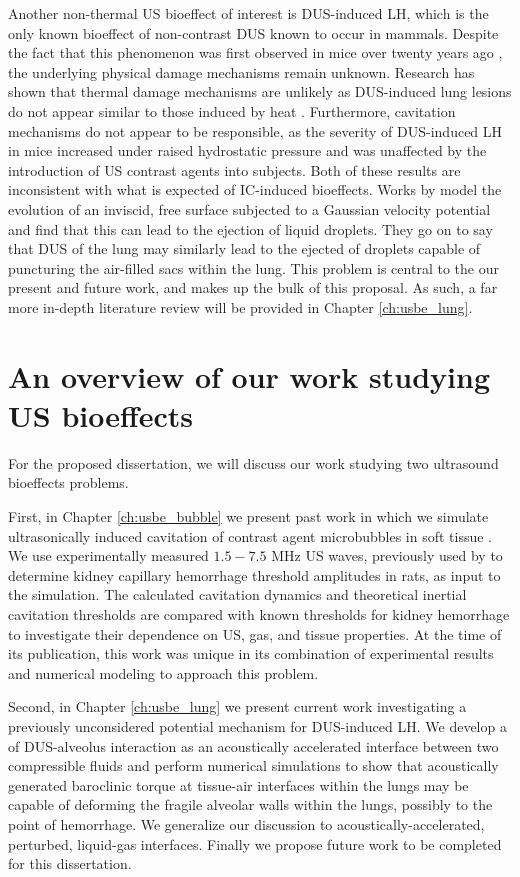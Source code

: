 Another non-thermal \ac{US} bioeffect of interest is \ac{DUS}-induced
\ac{LH}, which is the only known bioeffect of non-contrast \ac{DUS}
known to occur in mammals. Despite the fact that this phenomenon was
first observed in mice over twenty years ago \citep{Child1990}, the
underlying physical damage mechanisms remain unknown. Research has
shown that thermal damage mechanisms are unlikely as \ac{DUS}-induced
lung lesions do not appear similar to those induced by heat
\citep{Zachary2006}. Furthermore, cavitation mechanisms do not appear
to be responsible, as the severity of \ac{DUS}-induced \ac{LH} in mice
increased under raised hydrostatic pressure \citep{OBrien2000} and was
unaffected by the introduction of \ac{US} contrast agents into
subjects. Both of these results are inconsistent with what is expected
of \ac{IC}-induced bioeffects. Works by \cite{Tjan2007,Tjan2008} model
the evolution of an inviscid, free surface subjected to a Gaussian
velocity potential and find that this can lead to the ejection of
liquid droplets. They go on to say that \ac{DUS} of the lung may
similarly lead to the ejected of droplets capable of puncturing the
air-filled sacs within the lung. This problem is central to the our
present and future work, and makes up the bulk of this proposal. As
such, a far more in-depth literature review will be provided in
Chapter \ref{ch:usbe_lung}.

\section{An overview of our work studying \ac{US}
  bioeffects} \label{sec:usbe_intro_overview}%
For the proposed dissertation, we will discuss our work studying two
ultrasound bioeffects problems. 

First, in Chapter \ref{ch:usbe_bubble} we present past work in which
we simulate ultrasonically induced cavitation of contrast agent
microbubbles in soft tissue \citep{Patterson2012}. We use
experimentally measured $1.5-7.5$ MHz \ac{US} waves, previously used
by \cite{Miller2008b} to determine kidney capillary hemorrhage
threshold amplitudes in rats, as input to the simulation. The
calculated cavitation dynamics and theoretical inertial cavitation
thresholds \citep{Flynn1982,Apfel1982} are compared with known
thresholds for kidney hemorrhage to investigate their dependence on
US, gas, and tissue properties. At the time of its publication, this
work was unique in its combination of experimental results and
numerical modeling to approach this problem.

Second, in Chapter \ref{ch:usbe_lung} we present current work
investigating a previously unconsidered potential mechanism for
\ac{DUS}-induced \ac{LH}. We develop a of \ac{DUS}-alveolus
interaction as an acoustically accelerated interface between two
compressible fluids and perform numerical simulations to show that
acoustically generated baroclinic torque at tissue-air interfaces
within the lungs may be capable of deforming the fragile alveolar
walls within the lungs, possibly to the point of hemorrhage. We
generalize our discussion to acoustically-accelerated, perturbed,
liquid-gas interfaces. Finally we propose future work to be completed
for this dissertation.
